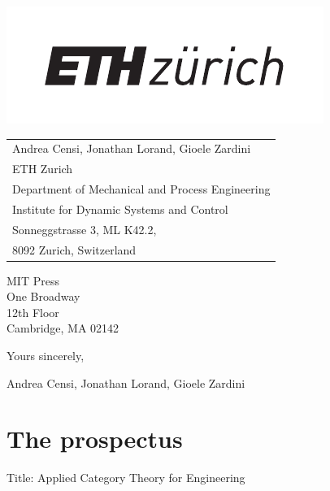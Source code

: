\documentclass[10pt, article, one side]{memoir}
\begin{document}
    \begin{minipage}{0.45\linewidth}
        \includegraphics[width=0.9\linewidth]{pics/ethlogo.pdf}
        \vfill
    \end{minipage}
    \begin{minipage}{0.5\linewidth}
        \begin{flushright}
            \begin{tabular}{l}
                Andrea Censi, Jonathan Lorand, Gioele Zardini \\
                ETH Zurich \\
                Department of Mechanical and Process Engineering \\
                Institute for Dynamic Systems and Control \\
                Sonneggstrasse 3, ML K42.2, \\
                8092 Zurich, Switzerland
            \end{tabular}
        \end{flushright}
    \end{minipage}

    \vspace{1cm}

    \noindent MIT Press\\
    \noindent One Broadway\\
    \noindent 12th Floor \\
    \noindent Cambridge, MA 02142\\[+7pt]


    \noindent Yours sincerely,

    \noindent \hspace{10cm} Andrea Censi, Jonathan Lorand, Gioele Zardini

    \newpage

    \chapter{The prospectus}
    Title: Applied Category Theory for Engineering
\end{document}
